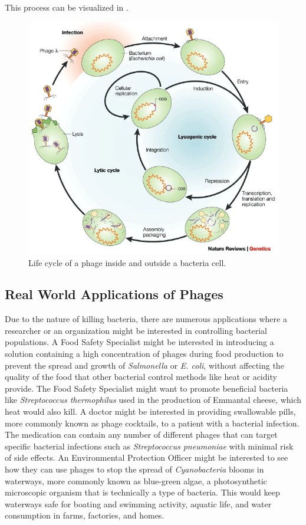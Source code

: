 This process can be visualized in . \cite{campbellFutureBacteriophageBiology2003}
\begin{figure}
    \centering
    \includegraphics[width=0.5\linewidth]{Figures/phage_life_cycle.png}
    \caption{Life cycle of a phage inside and outside a bacteria cell.}
    \label{fig:phage_life_cycle}
\end{figure}

\subsection{Real World Applications of Phages}
Due to the nature of killing bacteria, there are numerous applications where a researcher or an organization might be interested in controlling bacterial populations. A Food Safety Specialist might be interested in introducing a solution containing a high concentration of phages during food production to prevent the spread and growth of \textit{Salmonella} or \textit{E. coli}, without affecting the quality of the food that other bacterial control methods like heat or acidity provide. The Food Safety Specialist might want to promote beneficial bacteria like \textit{Streptococcus thermophilus} used in the production of Emmantal cheese, which heat would also kill. A doctor might be interested in providing swallowable pills, more commonly known as phage cocktails, to a patient with a bacterial infection. The medication can contain any number of different phages that can target specific bacterial infections such as \textit{Streptococcus pneumoniae} with minimal risk of side effects. An Environmental Protection Officer might be interested to see how they can use phages to stop the spread of \textit{Cyanobacteria} blooms in waterways, more commonly known as blue-green algae, a photosynthetic microscopic organism that is technically a type of bacteria. This would keep waterways safe for boating and swimming activity, aquatic life, and water consumption in farms, factories, and homes. 



